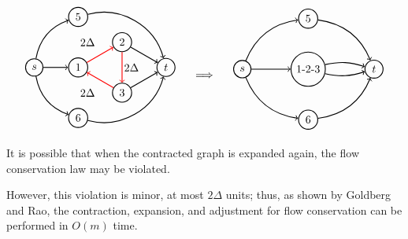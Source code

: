 \[\begin{tabular}{ccc}
    \begin{tikzpicture}[node distance={18mm}, thick , main/.style = {draw, circle}] 
    
    \node[main] (0) {$s$};
    \node[main] (1) at (1*1.4,0) {1};
    \node[main] (2) at (2*1.4,0.577*1.4) {2};
    \node[main] (3) at (2*1.4,-0.577*1.4) {3};
    \node[main] (4) at (3*1.4,0) {$t$};
    \node[main] (5) at (1*1.4,1.154*1.4) {$5$};
    \node[main] (6) at (1*1.4,-1.154*1.4) {$6$};

    \draw[->] (0) [bend left] to (5);
    \draw[->] (0) [bend right] to (6);
    \draw[->] (0)  to (1);
    \draw[->] (1)[red]  to (2);
    \draw[->] (2)[red]  to (3);
    \draw[->] (3)[red]  to (1);
    \draw[->] (2)  to (4);
    \draw[->] (3)  to (4);
    \draw[->] (5) [bend left = 45] to (4);
    \draw[->] (6) [bend right = 45] to (4);

    \node at (3.1,0) {$2\Delta$};
    \node at (1.7,0.577*1.4) {$2\Delta$};
    \node at (1.7,-0.577*1.4) {$2\Delta$};
    

\end{tikzpicture}&\begin{tikzpicture}
    \node {$\implies$};%
    \node at (0,1.4) {};
    \node at (0,-1.6) {};
\end{tikzpicture}  &
\begin{tikzpicture}[node distance={19mm}, thick , main/.style = {draw, circle}] 
    \node[main] (0) {$s$};
    \node[main] (1) at (1.5*1.4,0) {1-2-3};
    \node[main] (5) at (1.5*1.4,1.154*1.4) {$5$};
    \node[main] (6) at (1.5*1.4,-1.154*1.4) {$6$};
    \node[main] (4) at (3*1.4,0) {$t$};

    \draw[->] (0) [bend left] to (5);
    \draw[->] (5) [bend left] to (4);
    \draw[->] (0) [bend right] to (6);
    \draw[->] (6) [bend right] to (4);

    \draw[->] (0) to (1);
    \draw[->] (1) [bend left= 15] to (4);
    \draw[->] (1) [bend right = 15] to (4);

\end{tikzpicture}
\end{tabular}\]

\begin{obs}
    It is possible that when the contracted graph is expanded again, the flow conservation law may be violated.
\end{obs}
    However, this violation is minor, at most \(2\Delta\) units; thus, as shown by Goldberg and Rao, the contraction, expansion, and adjustment for flow conservation can be performed in \(O(m)\) time.

